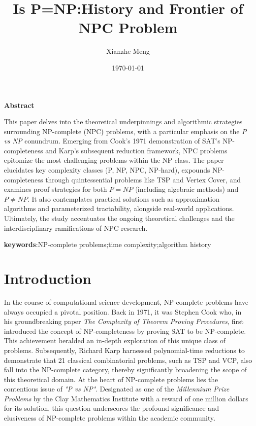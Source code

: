 \documentclass[acmsmall]{acmart}
\title{Is P=NP:History and Frontier of NPC Problem}
\author{Xianzhe Meng}
\date{\today}
\affiliation{
	\institution{Huazhong University of Science and Technology}
	\city{Wuhan}
	\state{Hubei}
	\country{China}}
\begin{document}
\renewcommand{\refname}{References}
\renewcommand{\tablename}{Table}

\renewenvironment{abstract}{
	\begin{center}
		\bfseries Abstract
		\vspace{0.5em}
	\end{center}
	\normalfont\small
}{%
	\par
}
	\graphicspath{{.}}
	\maketitle
	
	\begin{abstract}
		\setlength{\parskip}{-1em}
		This paper delves into the theoretical underpinnings and algorithmic strategies surrounding NP-complete (NPC) problems, with a particular emphasis on the \textit{P vs NP} conundrum. Emerging from Cook's 1971 demonstration of SAT's NP-completeness and Karp's subsequent reduction framework, NPC problems epitomize the most challenging problems within the NP class. The paper elucidates key complexity classes (P, NP, NPC, NP-hard), expounds NP-completeness through quintessential problems like TSP and Vertex Cover, and examines proof strategies for both \( P = NP \) (including algebraic methods) and \( P \neq NP \). It also contemplates practical solutions such as approximation algorithms and parameterized tractability, alongside real-world applications. Ultimately, the study accentuates the ongoing theoretical challenges and the interdisciplinary ramifications of NPC research.
		
	\end{abstract}
	\textbf{keywords}:NP-complete problems;time complexity;algorithm history
	
	\section{Introduction}
	In the course of computational science development, NP-complete problems have always occupied a pivotal position. Back in 1971, it was Stephen Cook who, in his groundbreaking paper \textit{The Complexity of Theorem Proving Procedures}\cite{cook1971complexity}, first introduced the concept of NP-completeness by proving SAT to be NP-complete. This achievement heralded an in-depth exploration of this unique class of problems. Subsequently, Richard Karp harnessed polynomial-time reductions to demonstrate that 21 classical combinatorial problems, such as TSP and VCP, also fall into the NP-complete category, thereby significantly broadening the scope of this theoretical domain. At the heart of NP-complete problems lies the contentious issue of \textit{"P vs NP"}. Designated as one of the \textit{Millennium Prize Problems} by the Clay Mathematics Institute with a reward of one million dollars for its solution\cite{claymillennium}, this question underscores the profound significance and elusiveness of NP-complete problems within the academic community.
	
\end{document}
